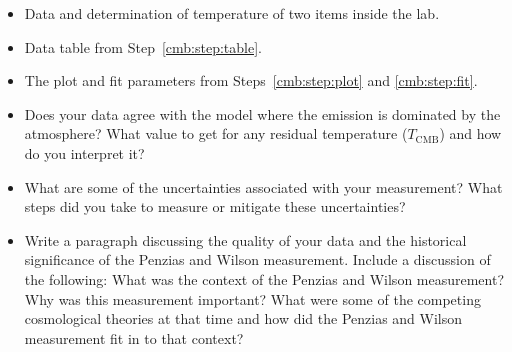 \begin{itemize}
	\item Data and determination of temperature of two items inside the lab.
	
	\item Data table from Step~\ref{cmb:step:table}.
	
	\item The plot and fit parameters from Steps~\ref{cmb:step:plot} and \ref{cmb:step:fit}.
	
	\item Does your data agree with the model where the emission is dominated by the atmosphere?  What value to get for any residual temperature ($T_\textrm{CMB}$) and how do you interpret it?
	
	\item What are some of the uncertainties associated with your measurement? What steps did you take to measure or mitigate these uncertainties?
	
	\item Write a paragraph discussing the quality of your data and the historical significance of the Penzias and Wilson measurement. Include a discussion of the following: What was the context of the Penzias and Wilson measurement? Why was this measurement important? What were some of the competing cosmological theories at that time and how did the Penzias and Wilson measurement fit in to that context?
\end{itemize}
